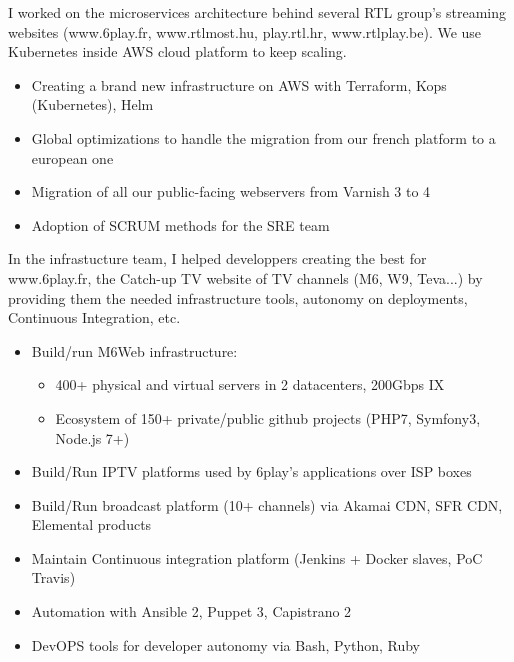 \documentclass[12pt,a4paper,roman]{moderncv}          %
\begin{document}
{I worked on the microservices architecture behind several RTL group's streaming websites (www.6play.fr, www.rtlmost.hu, play.rtl.hr, www.rtlplay.be). We use Kubernetes inside AWS cloud platform to keep scaling.
\begin{itemize}
  \item Creating a brand new infrastructure on AWS with Terraform, Kops (Kubernetes), Helm
  \item Global optimizations to handle the migration from our french platform to a european one
  \item Migration of all our public-facing webservers from Varnish 3 to 4
  \item Adoption of SCRUM methods for the SRE team
\end{itemize}}


{In the infrastucture team, I helped developpers creating the best for www.6play.fr, the Catch-up TV website of TV channels (M6, W9, Teva...) by providing them the needed infrastructure tools, autonomy on deployments, Continuous Integration, etc.
\begin{itemize}
  \item Build/run M6Web infrastructure:
  \begin{itemize}
    \item 400+ physical and virtual servers in 2 datacenters, 200Gbps IX
    \item Ecosystem of 150+ private/public github projects (PHP7, Symfony3, Node.js 7+)
  \end{itemize}
  \item Build/Run IPTV platforms used by 6play's applications over ISP boxes
  \item Build/Run broadcast platform (10+ channels) via Akamai CDN, SFR CDN, Elemental products
  \item Maintain Continuous integration platform (Jenkins + Docker slaves, PoC Travis)
  \item Automation with Ansible 2, Puppet 3, Capistrano 2
  \item DevOPS tools for developer autonomy via Bash, Python, Ruby
\end{itemize}}
\end{document}
